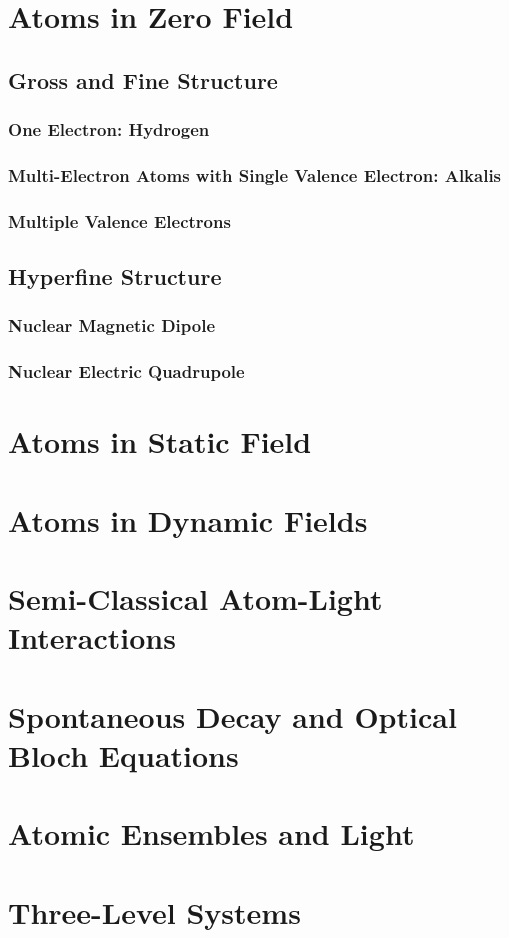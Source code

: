 \documentclass[11pt,a4paper]{article}
\begin{document}
\section{Atoms in Zero Field}

\subsection{Gross and Fine Structure}

\subsubsection{One Electron: Hydrogen}

\subsubsection{Multi-Electron Atoms with Single Valence Electron: Alkalis}

\subsubsection{Multiple Valence Electrons}

\subsection{Hyperfine Structure}

\subsubsection{Nuclear Magnetic Dipole}

\subsubsection{Nuclear Electric Quadrupole}

\section{Atoms in Static Field}

\section{Atoms in Dynamic Fields}

\section{Semi-Classical Atom-Light Interactions}

\section{Spontaneous Decay and Optical Bloch Equations}

\section{Atomic Ensembles and Light}

\section{Three-Level Systems}




\end{document}
